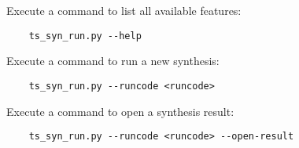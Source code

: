 \documentclass{tropic_design_spec}
\begin{document}

Execute a command to list all available features:

\begin{lstlisting}
    ts_syn_run.py --help
\end{lstlisting}

Execute a command to run a new synthesis:

\begin{lstlisting}
    ts_syn_run.py --runcode <runcode>
\end{lstlisting}

Execute a command to open a synthesis result:

\begin{lstlisting}
    ts_syn_run.py --runcode <runcode> --open-result
\end{lstlisting}


\pagebreak





\PrintOpenIssueSummary
\end{document}

